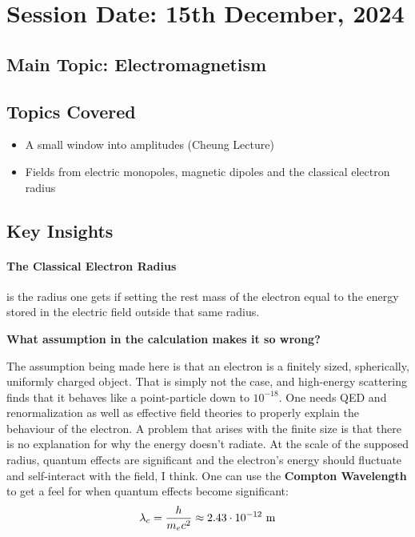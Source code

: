 \section{Session Date: 15th December, 2024}
\subsection*{Main Topic: Electromagnetism}
\subsection*{Topics Covered}
\begin{itemize}
    \item A small window into amplitudes (Cheung Lecture)
    \item Fields from electric monopoles, magnetic dipoles and the classical electron radius
\end{itemize}

\subsection*{Key Insights}
\paragraph{The Classical Electron Radius} is the radius one gets if setting the rest mass of the electron equal to the energy stored in the electric field outside that same radius. 

\textbf{What assumption in the calculation makes it so wrong?}

The assumption being made here is that an electron is a finitely sized, spherically, uniformly charged object. That is simply not the case, and high-energy scattering finds that it behaves like a point-particle down to \(10^{-18}\). One needs QED and renormalization as well as effective field theories to properly explain the behaviour of the electron. A problem that arises with the finite size is that there is no explanation for why the energy doesn't radiate. At the scale of the supposed radius, quantum effects are significant and the electron's energy should fluctuate and self-interact with the field, I think. One can use the \textbf{Compton Wavelength} to get a feel for when quantum effects become significant: \begin{align*}
    \lambda _c = \frac{h}{m_e c^{2} } \approx 2.43 \cdot 10^{-12}\ \rm{m}
\end{align*}  
